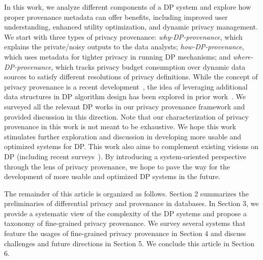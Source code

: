 In this work, we analyze different components of a DP system and explore how proper provenance metadata can offer benefits, including improved user understanding, enhanced utility optimization, and dynamic privacy management. We start with three types of privacy provenance: \textit{why-DP-provenance}, which explains the private/noisy outputs to the data analysts; \textit{how-DP-provenance}, which uses metadata for tighter privacy in running DP mechanisms; and \textit{where-DP-provenance}, which tracks privacy budget consumption over dynamic data sources to satisfy different resolutions of privacy definitions. While the concept of privacy provenance is a recent development~\cite{dprovdb}, the idea of leveraging additional data structures in DP algorithm design has been explored in prior work~\cite{johnson2020chorus,mcsherry2009pinq,gaboardi2016psi,NanayakkaraB0HR22visualizing}. We surveyed all the relevant DP works in our privacy provenance framework and provided discussion in this direction.  
Note that our characterization of privacy provenance in this work is not meant to be exhaustive. We hope this work stimulates further exploration and discussion in developing more usable and optimized systems for DP. 
This work also aims to complement existing visions on DP (including recent surveys~\cite{cummings2024advancing_DP_survey,near2021differential}). 
By introducing a system-oriented perspective through the lens of privacy provenance, we hope to pave the way for the development of more usable and optimized DP systems in the future.


The remainder of this article is organized as follows.
Section 2 summarizes the preliminaries of differential privacy and provenance in databases.
In Section 3, we provide a systematic view of the complexity of the DP systems and propose a taxonomy of fine-grained privacy provenance.
We survey several systems that feature the usages of fine-grained privacy provenance in Section 4 and discuss challenges and future directions in Section 5.
We conclude this article in Section 6.



